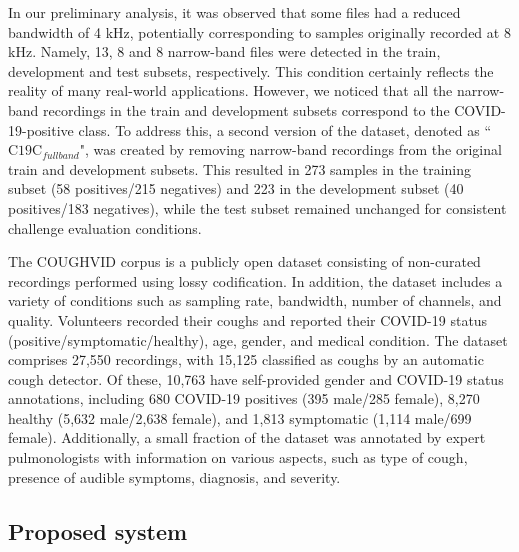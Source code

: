 In our preliminary analysis, it was observed that some files had a reduced bandwidth of 4 k\ac{Hz}, potentially corresponding to samples originally recorded at 8 k\ac{Hz}. Namely, 13, 8 and 8 narrow-band files were detected in the train, development and test subsets, respectively. This condition certainly reflects the reality of many real-world applications. However, we noticed that all the narrow-band recordings in the train and development subsets correspond to the COVID-19-positive class. To address this, a second version of the dataset, denoted as ``$\text{C19C}_{fullband}$", was created by removing narrow-band recordings from the original train and development subsets. This resulted in 273 samples in the training subset (58 positives/215 negatives) and 223 in the development subset (40 positives/183 negatives), while the test subset remained unchanged for consistent challenge evaluation conditions.

The COUGHVID corpus \cite{Orlandic2020} is a publicly open dataset consisting of non-curated recordings performed using lossy codification. In addition, the dataset includes a variety of conditions such as sampling rate, bandwidth, number of channels, and quality. Volunteers recorded their coughs and reported their COVID-19 status (positive/symptomatic/healthy), age, gender, and medical condition.
The dataset comprises 27,550 recordings, with 15,125 classified as coughs by an automatic cough detector. Of these, 10,763 have self-provided gender and COVID-19 status annotations, including 680 COVID-19 positives (395 male/285 female), 8,270 healthy (5,632 male/2,638 female), and 1,813 symptomatic (1,114 male/699 female). Additionally, a small fraction of the dataset was annotated by expert pulmonologists with information on various aspects, such as type of cough, presence of audible symptoms, diagnosis, and severity.

\subsection{Proposed system}

